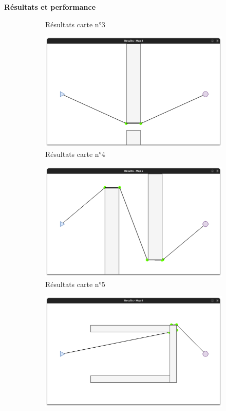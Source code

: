 \documentclass[aspectratio=169,10pt]{beamer}
\begin{document}
\begin{frame}{\textbf{Résultats et performance}}
\begin{figure}[H]
\begin{subfigure}[b]{0.24\textwidth}
			\caption*{Résultats carte n°3}
			\label{fig:rmap3}
		\end{subfigure}
		\hfill
		\begin{subfigure}[b]{0.24\textwidth}
			\centering
			\includegraphics[width=\textwidth]{IMAGES/rmap4.png}
			\caption*{Résultats carte n°4}
			\label{fig:rmap4}
		\end{subfigure}
		\vfill
		\begin{subfigure}[b]{0.24\textwidth}
			\centering
			\includegraphics[width=\textwidth]{IMAGES/rmap5.png}
			\caption*{Résultats carte n°5}
			\label{fig:rmap5}
		\end{subfigure}
		\hfill
		\begin{subfigure}[b]{0.24\textwidth}
			\centering
			\includegraphics[width=\textwidth]{IMAGES/rmap6.png}

\end{subfigure}
\end{figure}
\end{frame}
\end{document}

